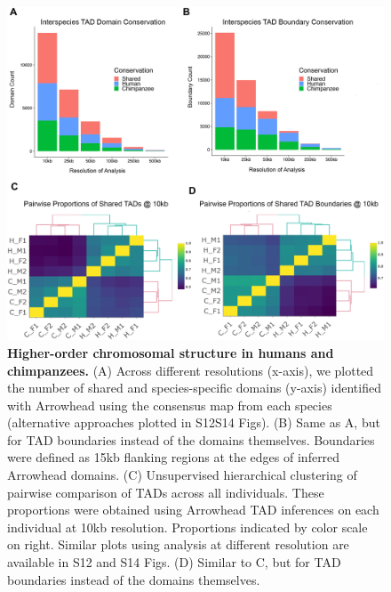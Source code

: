 \begin{figure}
\centering
\includegraphics[width=6in]{img/fig4.PNG}
\caption[Higher-order chromosomal structure in humans and chimpanzees.]{\textbf{Higher-order chromosomal structure in humans and chimpanzees.} (A) Across different resolutions (x-axis), we plotted the number of shared and species-specific domains (y-axis) identified with Arrowhead \cite{Durand.2016} using the consensus map from each species (alternative approaches plotted in S12{\textendash}S14 Figs). (B) Same as A, but for TAD boundaries instead of the domains themselves. Boundaries were defined as 15kb flanking regions at the edges of inferred Arrowhead domains. (C) Unsupervised hierarchical clustering of pairwise comparison of TADs across all individuals. These proportions were obtained using Arrowhead TAD inferences on each individual at 10kb resolution. Proportions indicated by color scale on right. Similar plots using analysis at different resolution are available in S12 and S14 Figs. (D) Similar to C, but for TAD boundaries instead of the domains themselves.}
\label{fig:ch02-fig4}
\end{figure}


